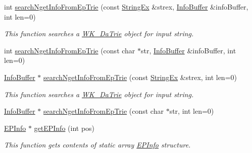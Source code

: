 \begin{CompactItemize}
int \hyperlink{classkmaOrange_1_1PreFinalEomi_cb448ebca8313831c9d6a91664165007}{searchNgetInfoFromEpTrie} (const \hyperlink{classStringEx}{StringEx} \&strex, \hyperlink{classkmaOrange_1_1InfoBuffer}{InfoBuffer} \&infoBuffer, int len=0)
\begin{CompactList}\small\item\em This function searches a \hyperlink{classkmaOrange_1_1WK__DaTrie}{WK\_\-DaTrie} object for input string. \item\end{CompactList}\item 
int \hyperlink{classkmaOrange_1_1PreFinalEomi_1440ff5046195cb344bb104b2a52f48a}{searchNgetInfoFromEpTrie} (const char $\ast$str, \hyperlink{classkmaOrange_1_1InfoBuffer}{InfoBuffer} \&infoBuffer, int len=0)
\item 
\hyperlink{classkmaOrange_1_1InfoBuffer}{InfoBuffer} $\ast$ \hyperlink{classkmaOrange_1_1PreFinalEomi_500080ebc6f091895b0942cd3e8a3978}{searchNgetInfoFromEpTrie} (const \hyperlink{classStringEx}{StringEx} \&strex, int len=0)
\begin{CompactList}\small\item\em This function searches a \hyperlink{classkmaOrange_1_1WK__DaTrie}{WK\_\-DaTrie} object for input string. \item\end{CompactList}\item 
\hyperlink{classkmaOrange_1_1InfoBuffer}{InfoBuffer} $\ast$ \hyperlink{classkmaOrange_1_1PreFinalEomi_cf038ba240b1357550799a6c1965eb95}{searchNgetInfoFromEpTrie} (const char $\ast$str, int len=0)
\item 
\hyperlink{structkmaOrange_1_1EPInfo}{EPInfo} $\ast$ \hyperlink{classkmaOrange_1_1PreFinalEomi_1b0f2ee161c2e9196ab4170cd3cb6d58}{getEPInfo} (int pos)
\begin{CompactList}\small\item\em This function gets contents of static array \hyperlink{structkmaOrange_1_1EPInfo}{EPInfo} structure. \item\end{CompactList}\end{CompactItemize}
